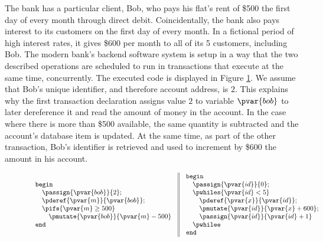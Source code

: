 The bank has a particular client, Bob, who pays his flat's rent of \$500 the first day of every month through direct debit. Coincidentally, the bank also pays interest to its customers on the first day of every month. In a fictional period of high interest rates, it gives \$600 per month to all of its 5 customers, including Bob. The modern bank's backend software system is setup in a way that the two described operations are scheduled to run in transactions that execute at the same time, concurrently. The executed code is displayed in Figure \ref{fig:bobCode}. We assume that Bob's unique identifier, and therefore account address, is $2$. This explains why the first transaction declaration assigns value $2$ to variable $\pvar{bob}$ to later dereference it and read the amount of money in the account. In the case where there is more than \$500 available, the same quantity is subtracted and the account's database item is updated. At the same time, as part of the other transaction, Bob's identifier is retrieved and used to increment by \$600 the amount in his account.
\begin{figure}[h]
	\begin{gather*}
		\begin{array}{c || c}
			\begin{array}{l}
				\mathtt{begin} \\
					\quad \passign{\pvar{bob}}{2}; \\
					\quad \pderef{\pvar{m}}{\pvar{bob}}; \\
					\quad \pifs{\pvar{m} \geq 500} \\
					\quad \quad \pmutate{\pvar{bob}}{\pvar{m} - 500} \\
				\mathtt{end}
			\end{array}
		&
			\begin{array}{l}
				\mathtt{begin} \\
					\quad \passign{\pvar{id}}{0}; \\
					\quad \pwhiles{\pvar{id} < 5} \\
						\quad \quad \pderef{\pvar{x}}{\pvar{id}}; \\
						\quad \quad \pmutate{\pvar{id}}{\pvar{x} + 600}; \\
						\quad \quad \passign{\pvar{id}}{\pvar{id} + 1} \\
					\quad \pwhilee \\
				\mathtt{end}
			\end{array}
		\end{array}
	\end{gather*}
	\label{fig:bobCode}
\end{figure}

